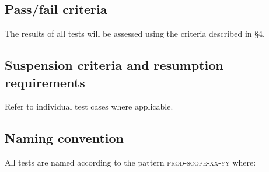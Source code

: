 \documentclass[DM,lsstdraft,STS,toc]{lsstdoc}
\begin{document}
\subsection{Pass/fail criteria}
\label{sec:passfail}

The results of all tests will be assessed using the criteria described in
 \S4.

\subsection{Suspension criteria and resumption requirements}
\label{suspension}

Refer to individual test cases where applicable.

\subsection{Naming convention}

All tests are named according to the pattern \textsc{prod-scope-xx-yy} where:
\end{document}
